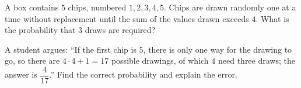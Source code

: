 A box contains $5$ chips, numbered $1,2,3,4,5$. Chips are drawn randomly one at a time without replacement until the sum of the values drawn exceeds $4$. What is the probability that $3$ draws are required?

A student argues: ``If the first chip is $5$, there is only one way for the drawing to go, so there are $4\cdot4+1=17$ possible drawings, of which $4$ need three draws; the answer is $\dfrac{4}{17}$.'' Find the correct probability and explain the error.
